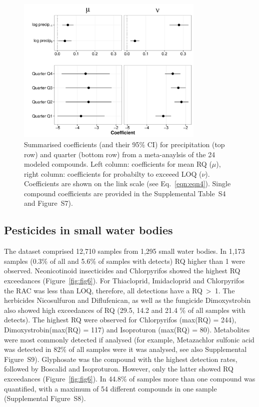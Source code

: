 \documentclass[journal=esthag,manuscript=article]{achemso}
\begin{document}
\begin{figure}[ht]
  \includegraphics[width=0.8\textwidth]{figure5.pdf}
  \caption{Summarised coefficients (and their 95\% CI) for precipitation (top row) and quarter (bottom row) from a meta-anaylsis of the 24 modeled compounds. Left column: coefficients for mean RQ ($\mu$), right column: coefficients for probabilty to exceeed LOQ ($\nu$). 
  Coefficients are shown on the link scale (see Eq.~\ref{eqn:eqn4}).
  Single compound coefficients are provided in the Supplemental Table~S4 and Figure~S7).
  }
  \label{fig:fig5}
\end{figure}



\subsection{Pesticides in small water bodies}
The dataset comprised 12,710 samples from 1,295 small water bodies.
In 1,173 samples (0.3\% of all and 5.6\% of samples with detects) RQ higher than 1 were observed.
Neonicotinoid insecticides and Chlorpyrifos showed the highest RQ exceedances (Figure~\ref{fig:fig6}).
For Thiacloprid, Imidacloprid and Chlorpyrifos the RAC was less than LOQ, therefore, all detections have a RQ~\textgreater~1. 
The herbicides Nicosulfuron and Diflufenican, as well as the fungicide Dimoxystrobin also showed high exceedances of RQ (29.5, 14.2 and 21.4 \% of all samples with detects).
The highest RQ were observed for Chlorpyrifos (max(RQ) = 244), Dimoxystrobin(max(RQ) = 117) and Isoproturon (max(RQ) = 80). 
Metabolites were most commonly detected if analysed (for example, Metazachlor sulfonic acid was detected in 82\% of all samples were it was analysed, see also Supplemental Figure~S9).
Glyphosate was the compound with the highest detection rates, followed by Boscalid and Isoproturon. 
However, only the latter showed RQ exceedances (Figure~\ref{fig:fig6}).
In 44.8\% of samples more than one compound was quantified, with a maximum of 54 different compounds in one sample (Supplemental Figure~S8). 
\end{document}
